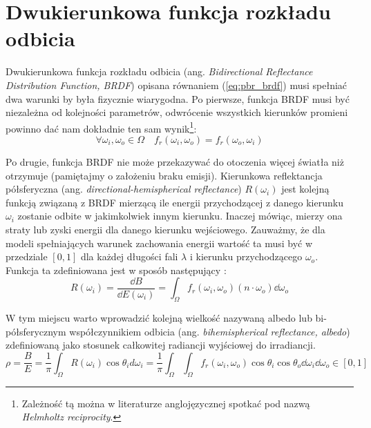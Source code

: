 \documentclass[../main.tex]{subfiles}
\begin{document}
\section{Dwukierunkowa funkcja rozkładu odbicia}

Dwukierunkowa funkcja rozkładu odbicia (ang. \textit{Bidirectional Reflectance Distribution Function, BRDF}) opisana równaniem (\ref{eq:pbr_brdf}) musi spełniać dwa warunki by była fizycznie wiarygodna. Po pierwsze, funkcja BRDF musi być niezależna od kolejności parametrów, odwrócenie wszystkich kierunków promieni powinno dać nam dokładnie ten sam wynik\footnote{Zależność tą można w literaturze anglojęzycznej spotkać pod nazwą \textit{Helmholtz reciprocity}.}:
\begin{equation}
\forall{\omega_i, \omega_o \in \Omega} \quad
  f_r(\omega_i, \omega_o) = f_r(\omega_o, \omega_i)
\end{equation}

Po drugie, funkcja BRDF nie może przekazywać do otoczenia więcej światła niż otrzymuje (pamiętajmy o założeniu braku emisji). Kierunkowa reflektancja półsferyczna (ang. \textit{directional-hemispherical reflectance}) $R(\omega_i)$ jest kolejną funkcją związaną z BRDF mierzącą ile energii przychodzącej z danego kierunku $\omega_i$ zostanie odbite w jakimkolwiek innym kierunku. Inaczej mówiąc, mierzy ona straty lub zyski energii dla danego kierunku wejściowego. Zauważmy, że dla modeli spełniających warunek zachowania energii wartość ta musi być w przedziale $\left[0,1\right]$ dla każdej długości fali $\lambda$ i kierunku przychodzącego $\omega_o$. Funkcja ta zdefiniowana jest w sposób następujący \cite{RealTimeRendering2008}:
\begin{equation}
  R(\omega_i) 
  = \frac{\dd B}{\dd E(\omega_i)} 
  = \int_{\Omega} {
    f_r(\omega_i, \omega_o)
    (n \cdot \omega_o)
    \dd \omega_o
  }
\end{equation}

W tym miejscu warto wprowadzić kolejną wielkość nazywaną albedo lub bi-półsferycznym współczynnikiem odbicia (ang. \textit{bihemispherical reflectance, albedo}) zdefiniowaną jako stosunek całkowitej radiancji wyjściowej do irradiancji.
\begin{equation}
    \rho = \frac{B}{E} = \frac{1}{\pi} \int_{\Omega}{
        R(\omega_i) \cos\theta_i d\omega_i
    }
    = \frac{1}{\pi} \int_{\Omega} \int_{\Omega} {
        f_r(\omega_i, \omega_o) 
        \cos\theta_i 
        \cos\theta_o 
        \dd\omega_i 
        \dd\omega_o
    }
    \in \left[0, 1\right]
\end{equation}
\end{document}
